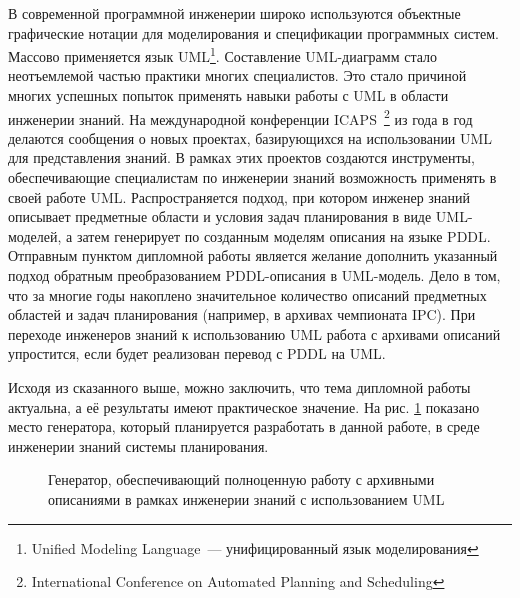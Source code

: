 В современной программной инженерии широко используются объектные графические нотации для моделирования и спецификации программных систем. Массово применяется язык UML\footnote{Unified Modeling Language~--- унифицированный язык моделирования}\cite{rambo-uml2}. Составление UML-диаграмм стало неотъемлемой частью практики многих специалистов. Это стало причиной многих успешных попыток применять навыки работы с UML в области инженерии знаний. На международной конференции ICAPS~\footnote{International Conference on Automated Planning and Scheduling} из года в год делаются сообщения о новых проектах\cite{icaps-1, icaps-2}, базирующихся на использовании UML для представления знаний. В рамках этих проектов создаются инструменты, обеспечивающие специалистам по инженерии знаний возможность применять в своей работе UML. Распространяется подход, при котором инженер знаний описывает предметные области и условия задач планирования в виде UML-моделей, а затем генерирует по созданным моделям описания на языке PDDL. Отправным пунктом дипломной работы является желание дополнить указанный подход обратным преобразованием PDDL-описания в UML-модель. Дело в том, что за многие годы накоплено значительное количество описаний предметных областей и задач планирования (например, в архивах чемпионата IPC). При переходе инженеров знаний к использованию UML работа с архивами описаний упростится, если будет реализован перевод с PDDL на UML.

Исходя из сказанного выше, можно заключить, что тема дипломной работы актуальна, а её результаты имеют практическое значение.
На рис. \ref{img:scheme} показано место генератора, который планируется разработать в данной работе, в среде инженерии знаний системы планирования.
 
\begin{figure}[h]
    \caption{Генератор, обеспечивающий полноценную работу с архивными описаниями в рамках инженерии знаний с использованием UML}
    \label{img:scheme}
\end{figure}   

